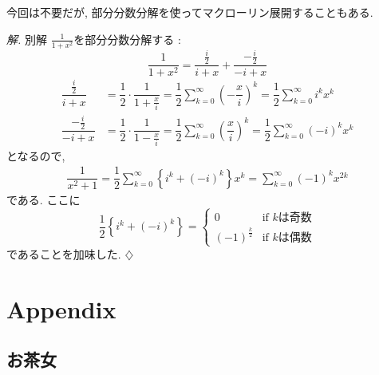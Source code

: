 \documentclass[titlepage]{jsarticle}
\numberwithin{equation}{section}
\newenvironment{kaitou}[1][解]{%
\begin{proofbox}%
\textit{#1. }\ignorespaces
}{%
\hfill$\diamondsuit$%
\end{proofbox}%
}
\begin{document}
今回は不要だが, 部分分数分解を使ってマクローリン展開することもある.
\begin{kaitou}{別解}
$\frac{1}{1 + x^2}$を部分分数分解する :
\[
\dfrac{1}{1 + x^2} = \dfrac{\frac{i}{2}}{i + x} + \dfrac{-\frac{i}{2}}{-i + x}
\]
\begin{align*}
\dfrac{\frac{i}{2}}{i + x} &= \dfrac{1}{2} \cdot \dfrac{1}{1 + \frac{x}{i}} = \dfrac{1}{2}\sum_{k = 0}^\infty \left(-\dfrac{x}{i}\right)^k = \dfrac{1}{2}\sum_{k=0}^\infty i^kx^k\\
\dfrac{-\frac{i}{2}}{-i + x} &= \dfrac{1}{2} \cdot \dfrac{1}{1 - \frac{x}{i}} = \dfrac{1}{2}\sum_{k = 0}^\infty \left(\dfrac{x}{i}\right)^k = \dfrac{1}{2}\sum_{k=0}^\infty (-i)^kx^k
\end{align*}
となるので,
\begin{align}
\dfrac{1}{x^2 + 1} = \dfrac{1}{2}\sum_{k=0}^\infty\left\{i^k + (-i)^k  \right\}x^k =  \boxed{\sum_{k = 0}^\infty (-1)^k x^{2k}} 
\end{align}
である. ここに
\[
\dfrac{1}{2}\left\{i^k + (-i)^k  \right\} = 
\begin{cases}
0 & \text{if}\,\,k\text{は奇数}\\
(-1)^{\frac{k}{2}} & \text{if}\,\,k\text{は偶数}
\end{cases}
\]
であることを加味した.
\end{kaitou}
\section{Appendix}
\subsection{お茶女}
\end{document}
